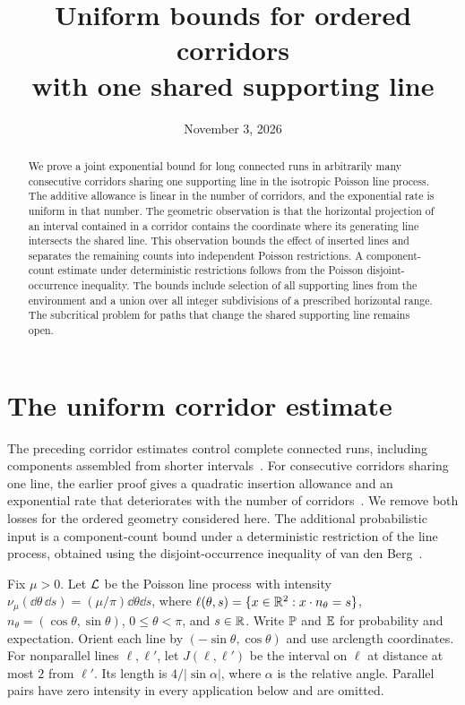 \documentclass[11pt,letterpaper]{article}
\title{Uniform bounds for ordered corridors\\with one shared supporting line}
\author{}
\date{November 3, 2026}
\begin{document}
\maketitle
\begin{abstract}
We prove a joint exponential bound for long connected runs in arbitrarily many consecutive corridors sharing one supporting line in the isotropic Poisson line process. The additive allowance is linear in the number of corridors, and the exponential rate is uniform in that number. The geometric observation is that the horizontal projection of an interval contained in a corridor contains the coordinate where its generating line intersects the shared line. This observation bounds the effect of inserted lines and separates the remaining counts into independent Poisson restrictions. A component-count estimate under deterministic restrictions follows from the Poisson disjoint-occurrence inequality. The bounds include selection of all supporting lines from the environment and a union over all integer subdivisions of a prescribed horizontal range. The subcritical problem for paths that change the shared supporting line remains open.
\end{abstract}

\section{The uniform corridor estimate}

The preceding corridor estimates control complete connected runs, including components assembled from shorter intervals~\cite{CR26}. For consecutive corridors sharing one line, the earlier proof gives a quadratic insertion allowance and an exponential rate that deteriorates with the number of corridors~\cite{JC26}. We remove both losses for the ordered geometry considered here. The additional probabilistic input is a component-count bound under a deterministic restriction of the line process, obtained using the disjoint-occurrence inequality of van den Berg~\cite{vdB96}.

Fix $\mu>0$. Let $\cL$ be the Poisson line process with intensity $\nu_\mu(\dd\theta\,\dd s)=(\mu/\pi)\dd\theta\dd s$, where $\ell(\theta,s)=\{x\in\R^2:x\cdot n_\theta=s\}$, $n_\theta=(\cos\theta,\sin\theta)$, $0\le\theta<\pi$, and $s\in\R$. Write $\P$ and $\E$ for probability and expectation. Orient each line by $(-\sin\theta,\cos\theta)$ and use arclength coordinates. For nonparallel lines $\ell,\ell'$, let $J(\ell,\ell')$ be the interval on $\ell$ at distance at most $2$ from $\ell'$. Its length is $4/|\sin\alpha|$, where $\alpha$ is the relative angle. Parallel pairs have zero intensity in every application below and are omitted.
\end{document}
